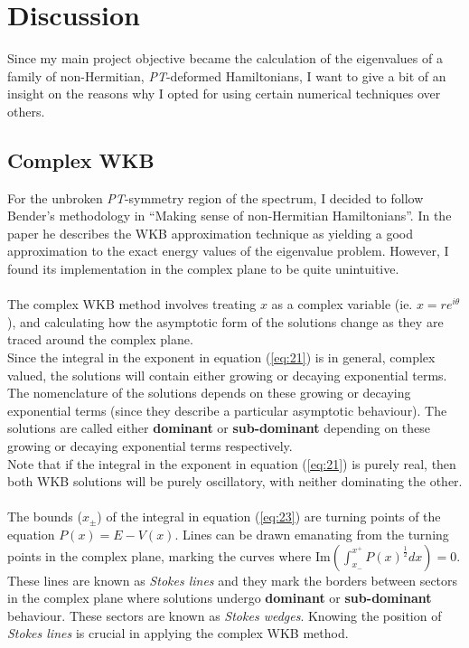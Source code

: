 \documentclass[10pt, a4paper, singlespacing]{report}
\newcommand\PT{\emph{PT}}
\begin{document}

\chapter{Discussion}\label{Discussion}
Since my main project objective became the calculation of the eigenvalues of a family of non-Hermitian, \PT-deformed Hamiltonians, I want to give a bit of an insight on the reasons why I opted for using certain numerical techniques over others.

\section{Complex WKB}\label{Complex WKB}
For the unbroken \PT-symmetry region of the spectrum, I decided to follow Bender's methodology in ``Making sense of non-Hermitian Hamiltonians''. In the paper he describes the WKB approximation technique as yielding a good approximation to the exact energy values of the eigenvalue problem. However, I found its implementation in the complex plane to be quite unintuitive.\\\\
The complex WKB method involves treating $x$ as a complex variable (ie. $x = re^{i\theta}$), and calculating how the asymptotic form of the solutions change as they are traced around the complex plane\cite{Sorrell}.\\
Since the integral in the exponent in equation (\ref{eq:21}) is in general, complex valued, the solutions will contain either growing or decaying exponential terms. The nomenclature of the solutions depends on these growing or decaying exponential terms (since they describe a particular asymptotic behaviour). The solutions are called either \textbf{dominant} or \textbf{sub-dominant} depending on these growing or decaying exponential terms respectively.\\
Note that if the integral in the exponent in equation (\ref{eq:21}) is purely real, then both WKB solutions will be purely oscillatory, with neither dominating the other\cite{Sorrell}.\\\\
The bounds ($x_{\pm}$) of the integral in equation (\ref{eq:23}) are turning points of the equation $P(x) = E - V(x)$. Lines can be drawn emanating from the turning points in the complex plane, marking the curves where $\mathrm{Im}(\int_{x_-}^{x^+} P(x)^{\frac{1}{2}}dx) = 0$. These lines are known as \emph{Stokes lines} and they mark the borders between sectors in the complex plane where solutions undergo \textbf{dominant} or \textbf{sub-dominant} behaviour. These sectors are known as \emph{Stokes wedges}. Knowing the position of \emph{Stokes lines} is crucial in applying the complex WKB method\cite{Sorrell}.
\end{document}
